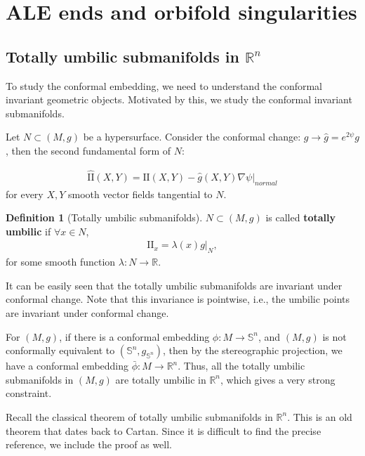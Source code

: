 \documentclass[12pt]{amsart}
\theoremstyle{definition}
\newtheorem{definition}[theorem]{Definition}
\begin{document}

\section{ALE ends and orbifold singularities}

\subsection{Totally umbilic submanifolds in \texorpdfstring{$\mathbb{R}^n$}{Rn}}

To study the conformal embedding, we need to understand the conformal invariant geometric objects. Motivated by this, we study the conformal invariant submanifolds. 

Let $N\subset (M,g)$ be a hypersurface. Consider the conformal change: $g\to \hat{g}= e^{2\psi} g$, then the second fundamental form of $N$:

\begin{align*}
    \hat{\text{II}}(X,Y)=\text{II}(X,Y)-\hat{g}(X,Y)\nabla\psi|_{normal}
\end{align*}
for every $X,Y$ smooth vector fields tangential to $N$.

\begin{definition}[Totally umbilic submanifolds]
    $N\subset(M,g)$ is called \textbf{totally umbilic} if $\forall x\in N$, 
    \begin{align*}
        {\text{II}}_x=\lambda(x) g|_N,
    \end{align*}
    for some smooth function $\lambda:N\to \mathbb{R}$.
\end{definition}
It can be easily seen that the totally umbilic submanifolds are invariant under conformal change. Note that this invariance is pointwise, i.e., the umbilic points are invariant under conformal change.

For $(M,g)$, if there is a conformal embedding $\phi: M \to \mathbb{S}^n$, and $(M,g)$ is not conformally equivalent to $(\mathbb{S}^n, g_{\mathbb{S}^n})$, then by the stereographic projection, we have a conformal embedding $\bar{\phi}:M \to \mathbb{R}^n$. Thus, all the totally umbilic submanifolds in $(M,g)$ are totally umbilic in $\mathbb{R}^n$, which gives a very strong constraint.

Recall the classical theorem of totally umbilic submanifolds in $\mathbb{R}^n$. This is an old theorem that dates back to Cartan. Since it is difficult to find the precise reference, we include the proof as well.
\end{document}
